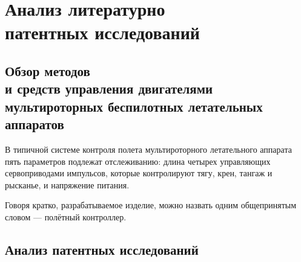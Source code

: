 \section{Анализ литературно \\
  патентных исследований}



\subsection{Обзор методов \\
  и средств управления  двигателями \\
  мультироторных беспилотных летательных аппаратов}

В типичной системе контроля полета
мультироторного летательного аппарата
пять параметров подлежат отслеживанию: длина четырех управляющих
сервоприводами импульсов, которые контролируют тягу, крен, тангаж и
рысканье, и напряжение питания.

Говоря кратко, разрабатываемое изделие,
можно назвать одним общепринятым словом — полётный контроллер.

\subsection{Анализ патентных исследований}
\newpage

